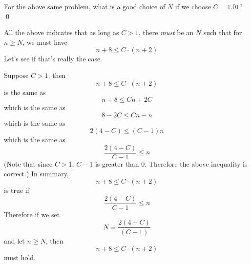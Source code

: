\begin{ex}
For the above same problem, what is a good choice of $N$ 
if we choose $C = 1.01$?
\qed
\end{ex}

All the above indicates that as long as $C > 1$, there \textit{must} be 
an $N$ such that for $n \geq N$, we must have
\[
n + 8 \leq C \cdot (n + 2)
\]
Let's see if that's really the case.

Suppose $C > 1$, then
\[
n + 8 \leq C \cdot (n + 2)
\]
is the same as
\[
n + 8 \leq Cn + 2C
\]
which is the same as
\[
8 - 2C \leq Cn - n
\]
which is the same as
\[
2(4 - C) \leq (C - 1)n
\]
which is the same as
\[
\frac{2(4 - C)}{C - 1} \leq n
\]
(Note that since $C > 1$, $C - 1$ is greater than $0$.
Therefore the above inequality is correct.)
In summary, 
\[
n + 8 \leq C \cdot (n + 2)
\]
is true if
\[
\frac{2(4 - C)}{C - 1} \leq n
\]
Therefore if we set 
\[
N = \frac{2(4 - C)}{(C - 1)}
\]
and let $n \geq N$, then
\[
n + 8 \leq C \cdot (n + 2)
\]
must hold.

